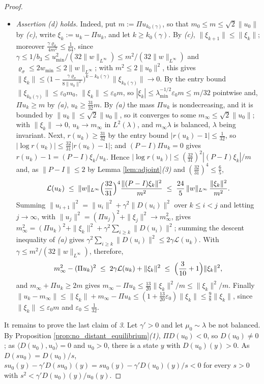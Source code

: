 \begin{proof}
\begin{itemize}
    \item \emph{Assertion \emph{(d)} holds.} Indeed, put $m:=\Pi u_{k_0(\gamma)}$, so that $m_0\leq m\leq\sqrt2\|u_0\|$ by \emph{(c)}, write $\xi_k:=u_k-\Pi u_k$, and let $k\geq k_0(\gamma)$. By \emph{(c)}, $\|\xi_{k+1}\|\leq\|\xi_k\|$; moreover $\frac{\gamma\varrho_\sigma}{4m^2}\leq\frac1{64}$, since $\gamma\leq1/b_3\leq u_{\min}^2/(32\|w\|_{L^\infty})\leq m^2/(32\|w\|_{L^\infty})$ and $\varrho_\sigma\leq2w_{\min}\leq2\|w\|_{L^\infty}$; with $m^2\leq2\|u_0\|^2$, this gives $\|\xi_k\|\leq\bigl(1-\frac{\gamma\varrho_\sigma}{8\|u_0\|^2}\bigr)^{k-k_0(\gamma)}\|\xi_{k_0(\gamma)}\|\rightarrow0$. By the entry bound $\|\xi_{k_0(\gamma)}\|\leq\varepsilon_0m_0$, $\|\xi_k\|\leq\varepsilon_0m$, so $|\xi_k|\leq\lambda_{\min}^{-1/2}\varepsilon_0m\leq m/32$ pointwise and, $\Pi u_k\geq m$ by \emph{(a)}, $u_k\geq\frac{31}{32}m$. By \emph{(a)} the mass $\Pi u_k$ is nondecreasing, and it is bounded by $\|u_k\|\leq\sqrt2\|u_0\|$, so it converges to some $m_\infty\leq\sqrt2\|u_0\|$; with $\|\xi_k\|\rightarrow0$, $u_k\rightarrow m_\infty$ in $L^2(\lambda)$, and $m_\infty\lambda$ is balanced, $\lambda$ being invariant. Next, $r(u_k)\geq\frac{31}{32}$ by the entry bound $|r(u_k)-1|\leq\frac1{32}$, so $|\log r(u_k)|\leq\frac{32}{31}|r(u_k)-1|$; and $(P-I)\Pi u_k=0$ gives $r(u_k)-1=(P-I)\xi_k/u_k$. Hence $|\log r(u_k)|\leq(\frac{32}{31})^2|(P-I)\xi_k|/m$ and, as $\|P-I\|\leq2$ by Lemma \ref{lem:adjoint}\emph{(3)} and $(\frac{32}{31})^4\leq\frac65$,
    \begin{equation*}
        \mathcal L(u_k)\;\leq\;\|w\|_{L^\infty}\Bigl(\frac{32}{31}\Bigr)^4\frac{\|(P-I)\xi_k\|^2}{m^2}\;\leq\;\frac{24}5\,\|w\|_{L^\infty}\,\frac{\|\xi_k\|^2}{m^2}.
    \end{equation*}
    Summing $\|u_{i+1}\|^2=\|u_i\|^2+\gamma^2\|D(u_i)\|^2$ over $k\leq i<j$ and letting $j\rightarrow\infty$, with $\|u_j\|^2=(\Pi u_j)^2+\|\xi_j\|^2\rightarrow m_\infty^2$, gives $m_\infty^2=(\Pi u_k)^2+\|\xi_k\|^2+\gamma^2\sum_{i\geq k}\|D(u_i)\|^2$; summing the descent inequality of \emph{(a)} gives $\gamma^2\sum_{i\geq k}\|D(u_i)\|^2\leq2\gamma\mathcal L(u_k)$. With $\gamma\leq m^2/(32\|w\|_{L^\infty})$, therefore,
    \begin{equation*}
        m_\infty^2-(\Pi u_k)^2\;\leq\;2\gamma\mathcal L(u_k)+\|\xi_k\|^2\;\leq\;\Bigl(\frac3{10}+1\Bigr)\|\xi_k\|^2,
    \end{equation*}
    and $m_\infty+\Pi u_k\geq2m$ gives $m_\infty-\Pi u_k\leq\frac{13}{20}\|\xi_k\|^2/m\leq\|\xi_k\|^2/m$. Finally $\|u_k-m_\infty\|\leq\|\xi_k\|+m_\infty-\Pi u_k\leq(1+\frac{13}{20}\varepsilon_0)\|\xi_k\|\leq\frac98\|\xi_k\|$, since $\|\xi_k\|\leq\varepsilon_0m$ and $\varepsilon_0\leq\frac1{32}$.
\end{itemize}
It remains to prove the last claim of \emph{3}. Let $\gamma'>0$ and let $\mu_0\sim\lambda$ be not balanced. By Proposition \ref{prop:no_distant_equilibrium}\emph{(1)}, $\Pi D(u_0)<0$, so $D(u_0)\neq0$; as $\langle D(u_0),u_0\rangle=0$ and $u_0>0$, there is a state $y$ with $D(u_0)(y)>0$. As $D(su_0)=D(u_0)/s$, $su_0(y)-\gamma'D(su_0)(y)=su_0(y)-\gamma'D(u_0)(y)/s<0$ for every $s>0$ with $s^2<\gamma'D(u_0)(y)/u_0(y)$.


\end{proof}
